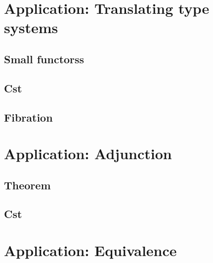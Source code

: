 \documentclass[sigconf,review,anonymous]{acmart}
\begin{document}
\section{Application: Translating type systems}
\subsection{Small functorss}
\subsection{Cst}
\subsection{Fibration}
\section{Application: Adjunction}
\subsection{Theorem}
\subsection{Cst}
\section{Application: Equivalence}





\end{document}
